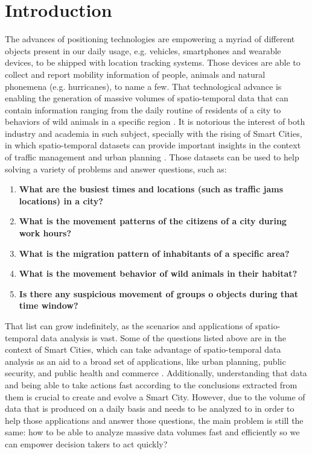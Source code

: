 \chapter{Introduction}
\label{chp:introduction}
The advances of positioning technologies are empowering a myriad of different objects present in our daily usage, e.g.
vehicles, smartphones and wearable devices, to be shipped with location tracking systems. Those devices are able to
collect and report mobility information of people, animals and natural phonemena (e.g. hurricanes), to name a few. That
technological advance is enabling the generation of massive volumes of spatio-temporal data that can contain information
ranging from the daily routine of residents of a city \citep{whatdidyoudo} to behaviors of wild animals in a specific
region \citep{trajclustering}\citep{miningperiodic}. It is notorious the interest of both industry and academia in such
subject, specially with the rising of Smart Cities, in which spatio-temporal datasets can provide important insights in
the context of traffic management and urban planning \citep{gissmartcities}\citep{parallelsmartcities}. Those datasets
can be used to help solving a variety of problems and answer questions, such as:

\begin{enumerate}
    \item \textbf{What are the busiest times and locations (such as traffic jams locations) in a city?}
        \citep{visualtrafficjam}
    \item \textbf{What is the movement patterns of the citizens of a city during work hours?}
    \item \textbf{What is the migration pattern of inhabitants of a specific area?}
    \item \textbf{What is the movement behavior of wild animals in their habitat?} \citep{movemine}
    \item \textbf{Is there any suspicious movement of groups o objects during that time window?}
\end{enumerate}

That list can grow indefinitely, as the scenarios and applications of spatio-temporal data analysis is vast. Some of the
questions listed above are in the context of Smart Cities, which can take advantage of spatio-temporal data analysis as
an aid to a broad set of applications, like urban planning, public security, and public health and commerce
\citep{ieeesmartcities}. Additionally, understanding that data and being able to take actions fast according to the
conclusions extracted from them is crucial to create and evolve a Smart City. However, due to the volume of data that is
produced on a daily basis and needs to be analyzed to in order to help those applications and answer those questions,
the main problem is still the same: how to be able to analyze massive data volumes fast and efficiently so we can
empower decision takers to act quickly?


